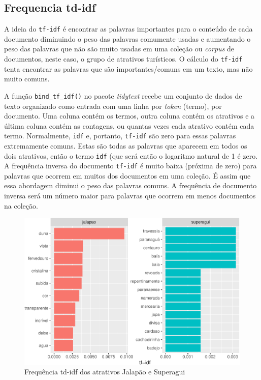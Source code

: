 \documentclass[preprint, 3p,
authoryear]{elsarticle} %
\begin{document}
\hypertarget{frequencia-td-idf}{%
\subsection{Frequencia td-idf}\label{frequencia-td-idf}}

A ideia do \texttt{tf-idf} é encontrar as palavras importantes para o
conteúdo de cada documento diminuindo o peso das palavras comumente
usadas e aumentando o peso das palavras que não são muito usadas em uma
coleção ou \emph{corpus} de documentos, neste caso, o grupo de atrativos
turísticos. O cálculo do \texttt{tf-idf} tenta encontrar as palavras que
são importantes/comuns em um texto, mas não muito comuns.

A função \texttt{bind\_tf\_idf()} no pacote \emph{tidytext} recebe um
conjunto de dados de texto organizado como entrada com uma linha por
\emph{token} (termo), por documento. Uma coluna contém os termos, outra
coluna contém os atrativos e a última coluna contém as contagens, ou
quantas vezes cada atrativo contém cada termo. Normalmente, \texttt{idf}
e, portanto, \texttt{tf-idf} são zero para essas palavras extremamente
comuns. Estas são todas as palavras que aparecem em todos os dois
atrativos, então o termo \texttt{idf} (que será então o logaritmo
natural de 1 é zero. A frequência inversa do documento \texttt{tf-idf} é
muito baixa (próxima de zero) para palavras que ocorrem em muitos dos
documentos em uma coleção. É assim que essa abordagem diminui o peso das
palavras comuns. A frequência de documento inversa será um número maior
para palavras que ocorrem em menos documentos na coleção.

\begin{figure}[H]

{\centering \includegraphics{bookdown-artigo_files/figure-latex/fig4-1} 

}

\caption{Frequência td-idf dos atrativos Jalapão e Superagui}\label{fig:fig4}
\end{figure}
\end{document}
